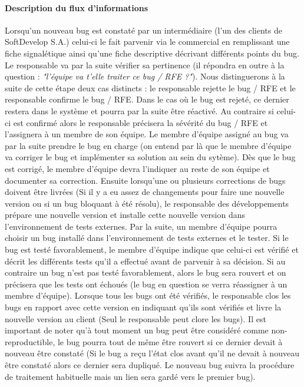 \documentclass{article}[12pt]
\begin{document}
\paragraph{Description du flux d'informations}
Lorsqu'un nouveau bug est constaté par un intermédiaire (l'un des clients de SoftDevelop S.A.) celui-ci le fait parvenir via le commercial en remplissant une fiche signalétique ainsi qu'une fiche descriptive décrivant différents points du bug. Le responsable va par la suite vérifier sa pertinence (il répondra en outre à la question : \emph{"l'équipe va t'elle traiter ce bug / RFE ?"}). 
\newline
\newline
Nous distinguerons à la suite de cette étape deux cas distincts : le responsable rejette le bug / RFE et le responsable confirme le bug / RFE. Dans le cas où le bug est rejeté, ce dernier restera dans le système et pourra par la suite être réactivé. Au contraire si celui-ci est confirmé alors le responsable précisera la sévérité du bug / RFE et l'assignera à un membre de son équipe. Le membre d'équipe assigné au bug va par la suite prendre le bug en charge (on entend par là que le membre d'équipe va corriger le bug et implémenter sa solution au sein du sytème). 
\newline
\newline
Dès que le bug est corrigé, le membre d'équipe devra l'indiquer au reste de son équipe et documenter sa correction. Ensuite lorsqu'une ou plusieurs corrections de bugs doivent être livrées (Si il y a eu assez de changements pour faire une nouvelle version ou si un bug bloquant à été résolu), le responsable des développements prépare une nouvelle version et installe cette nouvelle version dans l'environnement de tests externes.
\newline
\newline
Par la suite, un membre d'équipe pourra choisir un bug installé dans l'environnement de tests externes et le tester. Si le bug est testé favorablement, le membre d'équipe indique que celui-ci est vérifié et décrit les différents tests qu'il a effectué avant de parvenir à sa décision. Si au contraire un bug n'est pas testé favorablement, alors le bug sera rouvert et on précisera que les tests ont échoués (le bug en question se verra réassigner à un membre d'équipe).
\newline
\newline
Lorsque tous les bugs ont été vérifiés, le responsable clos les bugs en rapport avec cette version en indiquant qu'ils sont vérifiés et livre la nouvelle version au client (Seul le responsable peut clore les bugs).
\newline
\newline
Il est important de noter qu'à tout moment un bug peut être considéré comme non-reproductible, le bug pourra tout de même être rouvert si ce dernier devait à nouveau être constaté (Si le bug a reçu l'état clos avant qu'il ne devait à nouveau être constaté alors ce dernier sera dupliqué. Le nouveau bug suivra la procédure de traitement habituelle mais un lien sera gardé vers le premier bug).
\newpage
\end{document}
